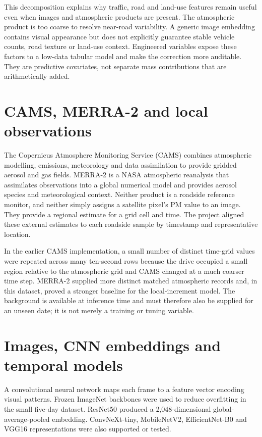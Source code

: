 \documentclass[11pt,a4paper,oneside]{report}
\begin{document}
This decomposition explains why traffic, road and land-use features remain useful
even when images and atmospheric products are present. The atmospheric product is
too coarse to resolve near-road variability. A generic image embedding contains
visual appearance but does not explicitly guarantee stable vehicle counts, road
texture or land-use context. Engineered variables expose these factors to a
low-data tabular model and make the correction more auditable. They are predictive
covariates, not separate mass contributions that are arithmetically added.

\section{CAMS, MERRA-2 and local observations}
The Copernicus Atmosphere Monitoring Service (CAMS) combines atmospheric modelling,
emissions, meteorology and data assimilation to provide gridded aerosol and gas
fields. MERRA-2 is a NASA atmospheric reanalysis that assimilates observations into
a global numerical model and provides aerosol species and meteorological context.
Neither product is a roadside reference monitor, and neither simply assigns a
satellite pixel's PM value to an image. They provide a regional estimate for a grid
cell and time. The project aligned these external estimates to each roadside sample
by timestamp and representative location.

In the earlier CAMS implementation, a small number of distinct time-grid values were
repeated across many ten-second rows because the drive occupied a small region
relative to the atmospheric grid and CAMS changed at a much coarser time step.
MERRA-2 supplied more distinct matched atmospheric records and, in this dataset,
proved a stronger baseline for the local-increment model. The background is
available at inference time and must therefore also be supplied for an unseen date;
it is not merely a training or tuning variable.

\section{Images, CNN embeddings and temporal models}
A convolutional neural network maps each frame to a feature vector encoding visual
patterns. Frozen ImageNet backbones were used to reduce overfitting in the small
five-day dataset. ResNet50 produced a 2,048-dimensional global-average-pooled
embedding. ConvNeXt-tiny, MobileNetV2, EfficientNet-B0 and VGG16 representations
were also supported or tested.
\end{document}
